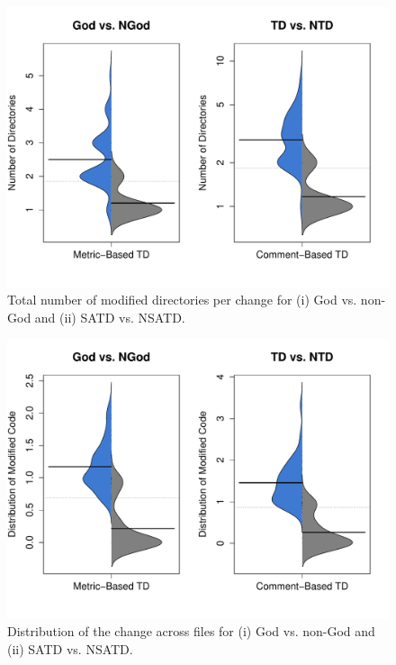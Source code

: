 {\begin{figure}[!hp]
	\centering
	\includegraphics[width=120mm]{figures/chapter4/rq3_nd}
	\caption{Total number of modified directories per change for (i) God vs. non-God and (ii) SATD vs. NSATD.}
	\label{figure:ch4_number_of_directories}
\end{figure}



\begin{figure}[!hp]
	\centering
	\includegraphics[width=120mm]{figures/chapter4/rq3_entropy}
	\caption{Distribution of the change across files for (i) God vs. non-God and (ii) SATD vs. NSATD.}
	\label{figure:ch4_mtdocatdf}
\end{figure}




}
